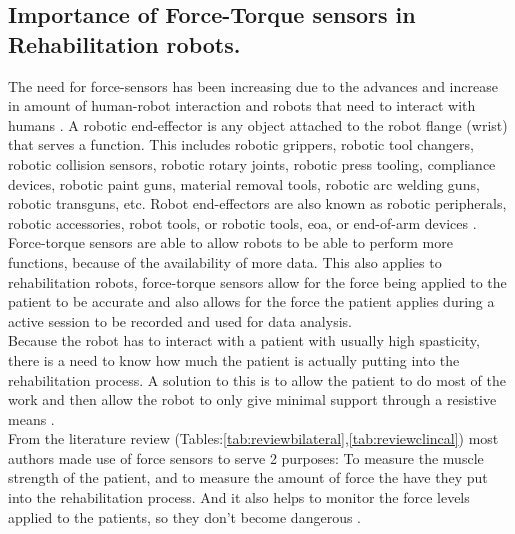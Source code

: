 \subsection{Importance of Force-Torque sensors in Rehabilitation robots.}
The need for force-sensors has been increasing due to the advances and increase in amount of human-robot interaction and robots that need to interact with humans \cite{Kim2017}. A robotic end-effector is any object attached to the robot flange (wrist) that serves a function. This includes robotic grippers, robotic tool changers, robotic collision sensors, robotic rotary joints, robotic press tooling, compliance devices, robotic paint guns, material removal tools, robotic arc welding guns, robotic transguns, etc. Robot end-effectors are also known as robotic peripherals, robotic accessories, robot tools, or robotic tools, \ac{eoa}, or end-of-arm devices \cite{atiende}.
Force-torque sensors are able to allow robots to be able to perform more functions, because of the availability of more data. This also applies to rehabilitation robots, force-torque sensors allow for the force being applied to the patient to be accurate and also allows for the force the patient applies during a active session to be recorded and used for data analysis.\\
Because the robot has to interact with a patient with usually high spasticity, there is a need to know how much the patient is actually putting into the rehabilitation process. A solution to this is to allow the patient to do most of the work and then allow the robot to only give minimal support through a resistive means \cite{Hesse2003}.\\
From the literature review (Tables:\ref{tab:reviewbilateral},\ref{tab:reviewclincal}) most authors made use of force sensors to serve 2 purposes: To measure the muscle strength of the patient, and to measure the amount of force the have they put into the rehabilitation process. And it also helps to monitor the force levels applied to the patients, so they don’t become dangerous \cite{Adamovich2009,Diez2018}.
